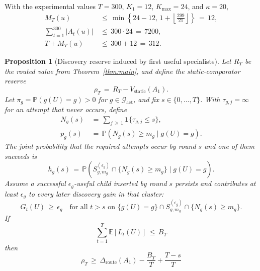 \documentclass{article} %
\newtheorem{proposition}[theorem]{Proposition}
\begin{document}
With the experimental values \(T=300\), \(K_1=12\), \(K_{\max}=24\), and
\(\kappa=20\),
\begin{equation}
\begin{aligned}
M_T(u)
&\,\leq\,\min\!\left\{
24-12,\,
1+\left\lfloor\frac{299}{21}\right\rfloor
\right\}
\,=\,12, \\
\sum_{t=1}^{300}|A_t(u)|
&\,\leq\,300\cdot24\,=\,7200, \\
T+M_T(u)
&\,\leq\,300+12\,=\,312.
\end{aligned}
\end{equation}

\begin{proposition}[Discovery reserve induced by first useful specialists]
\label{prop:4}
Let \(R_T\) be the routed value from Theorem~\ref{thm:main}, and define the
static-comparator reserve
\begin{equation}
\rho_T
\,=\,
R_T
-
V_{\mathrm{static}}(A_1).
\end{equation}
Let \(\pi_g=\mathbb P(g(U)=g)>0\) for
\(g\in\mathcal G_{\mathrm{act}}\), and fix \(s\in\{0,\ldots,T\}\).  With
\(\tau_{g,j}=\infty\) for an attempt that never occurs, define
\begin{equation}
\begin{aligned}
N_g(s)
&\,=\,
\sum_{j\,\ge\, 1}
\mathbf{1}\{\tau_{g,j}\leq s\}, \\
p_g(s)
&\,=\,
\mathbb{P}\!\left(
N_g(s)\geq m_g
\mid
g(U)=g
\right).
\end{aligned}
\end{equation}
The joint probability that the required attempts occur by round \(s\) and one
of them succeeds is
\begin{equation}
h_g(s)
\,=\,
\mathbb P\!\left(
S_{g,m_g}^{(\epsilon_g)}
\cap\{N_g(s)\ge m_g\}
\mid g(U)=g
\right).
\end{equation}
Assume a successful \(\epsilon_g\)-useful child inserted by round \(s\)
persists and contributes at least \(\epsilon_g\) to every later discovery gain
in that cluster:
\begin{equation}
G_t(U)
\,\geq\,
\epsilon_g
\quad
\text{for all }t>s
\text{ on }
\{g(U)=g\}\cap S_{g,m_g}^{(\epsilon_g)}
\cap\{N_g(s)\ge m_g\}.
\end{equation}
If
\begin{equation}
\sum_{t=1}^{T}
\mathbb{E}[L_t(U)]
\,\leq\,
B_T
\end{equation}
then
\begin{equation}
\rho_T
\,\geq\,
\Delta_{\mathrm{route}}(A_1)
-
\frac{B_T}{T}
+
\frac{T-s}{T}

\end{equation}
\end{proposition}
\end{document}
